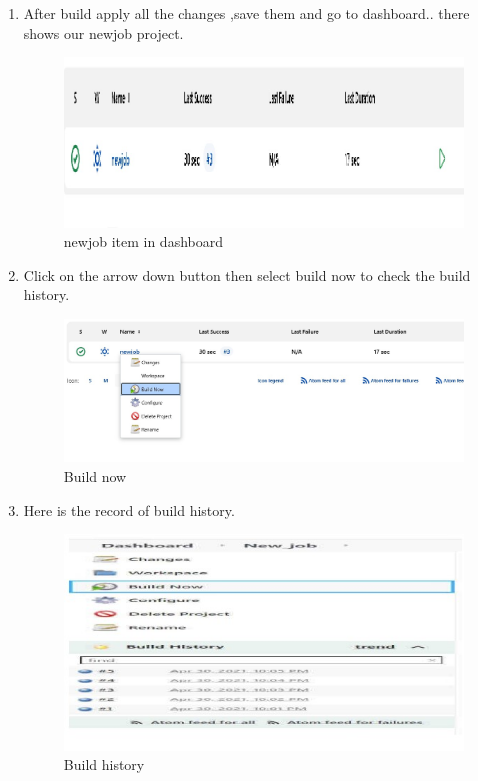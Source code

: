 \documentclass[12pt]{article}
\begin{document}
\begin{enumerate}
\item After build apply all the changes ,save them and go to dashboard.. there shows our newjob project.

\begin{figure}[H]
\centering
\includegraphics[scale=0.5]{fig69}
\caption{newjob item in dashboard}
\vspace{0.6\baselineskip}
\end{figure}

\item Click on the arrow down button then select build now to check the build history.

\begin{figure}[H]
\centering
\includegraphics[scale=0.5]{fig70}
\caption{Build now}
\vspace{0.6\baselineskip}
\end{figure}

\item Here is the record of build history.

\begin{figure}[H]
\centering
\includegraphics[scale=0.6]{fig71}
\caption{Build history}
\vspace{0.6\baselineskip}
\end{figure}


\end{enumerate}
\end{document}
